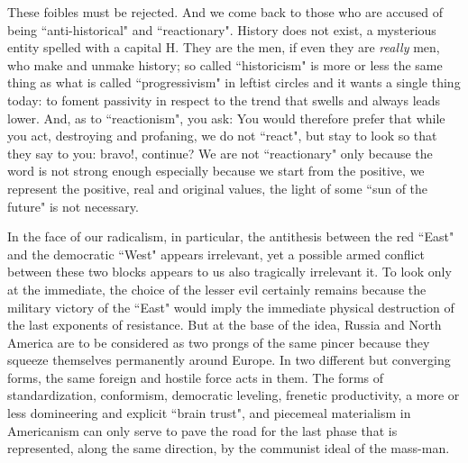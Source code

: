 These foibles must be rejected. And we come back to those who are accused of being ``anti-historical" and ``reactionary". History does not exist, a mysterious entity spelled with a capital H. They are the men, if even they are \emph{really} men, who make and unmake history; so called ``historicism" is more or less the same thing as what is called ``progressivism" in leftist circles and it wants a single thing today: to foment passivity in respect to the trend that swells and always leads lower. And, as to ``reactionism", you ask: You would therefore prefer that while you act, destroying and profaning, we do not ``react", but stay to look so that they say to you: bravo!, continue? We are not ``reactionary" only because the word is not strong enough especially because we start from the positive, we represent the positive, real and original values, the light of some ``sun of the future" is not necessary.

In the face of our radicalism, in particular, the antithesis between the red ``East" and the democratic ``West" appears irrelevant, yet a possible armed conflict between these two blocks appears to us also tragically irrelevant it. To look only at the immediate, the choice of the lesser evil certainly remains because the military victory of the ``East" would imply the immediate physical destruction of the last exponents of resistance. But at the base of the idea, Russia and North America are to be considered as two prongs of the same pincer because they squeeze themselves permanently around Europe. In two different but converging forms, the same foreign and hostile force acts in them. The forms of standardization, conformism, democratic leveling, frenetic productivity, a more or less domineering and explicit ``brain trust", and piecemeal materialism in Americanism can only serve to pave the road for the last phase that is represented, along the same direction, by the communist ideal of the mass-man.

